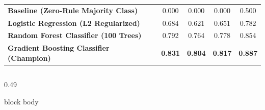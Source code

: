 \documentclass[aspectratio=169, 10pt]{beamer}
\newenvironment{card}[1][]{%
        \begin{beamercolorbox}[rounded=true,shadow=false,wd=\linewidth,sep=3.5pt,#1]{block body}%
        \fontsize{7.8pt}{9.8pt}\selectfont%
    }{%
        \end{beamercolorbox}%
    }
\begin{document}
\begin{frame}[t]
\begin{table}[h]
\begin{tabular}{p{4.2cm}cccc}
                \textbf{Baseline (Zero-Rule Majority Class)} & 0.000 & 0.000 & 0.000 & 0.500 \\                                                                                                        
                \textbf{Logistic Regression (L2 Regularized)} & 0.684 & 0.621 & 0.651 & 0.782 \\                                                                                                       
                \textbf{Random Forest Classifier (100 Trees)} & 0.792 & 0.764 & 0.778 & 0.854 \\                                                                                                       
                \textbf{Gradient Boosting Classifier (Champion)} & \textbf{0.831} & \textbf{0.804} & \textbf{0.817} & \textbf{0.887} \\                                                                
                \bottomrule                                                                                                                                                                            
            \end{tabular}                                                                                                                                                                              
        \end{table}                                                                                                                                                                                    
        \vspace{-0.15cm}                                                                                                                                                                               
        \begin{columns}[T]                                                                                                                                                                             
            \begin{column}{0.49\textwidth}                                                                                                                                                             
                \begin{card}                                                                                                                                                                           

\end{card}
\end{column}
\end{columns}
\end{frame}
\end{document}
